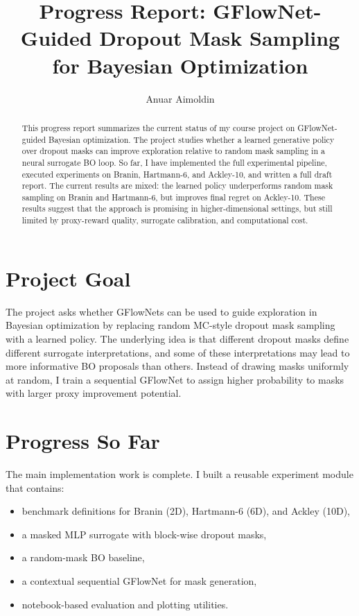 \documentclass{article}
\title{Progress Report: GFlowNet-Guided Dropout Mask Sampling for Bayesian Optimization}
\author{Anuar Aimoldin}
\date{}
\begin{document}
\maketitle

\begin{abstract}
This progress report summarizes the current status of my course project on GFlowNet-guided Bayesian optimization. The project studies whether a learned generative policy over dropout masks can improve exploration relative to random mask sampling in a neural surrogate BO loop. So far, I have implemented the full experimental pipeline, executed experiments on Branin, Hartmann-6, and Ackley-10, and written a full draft report. The current results are mixed: the learned policy underperforms random mask sampling on Branin and Hartmann-6, but improves final regret on Ackley-10. These results suggest that the approach is promising in higher-dimensional settings, but still limited by proxy-reward quality, surrogate calibration, and computational cost.
\end{abstract}

\section{Project Goal}

The project asks whether GFlowNets can be used to guide exploration in Bayesian optimization by replacing random MC-style dropout mask sampling with a learned policy. The underlying idea is that different dropout masks define different surrogate interpretations, and some of these interpretations may lead to more informative BO proposals than others. Instead of drawing masks uniformly at random, I train a sequential GFlowNet to assign higher probability to masks with larger proxy improvement potential.

\section{Progress So Far}

The main implementation work is complete. I built a reusable experiment module that contains:
\begin{itemize}
    \item benchmark definitions for Branin (2D), Hartmann-6 (6D), and Ackley (10D),
    \item a masked MLP surrogate with block-wise dropout masks,
    \item a random-mask BO baseline,
    \item a contextual sequential GFlowNet for mask generation,
    \item notebook-based evaluation and plotting utilities.
\end{itemize}
\end{document}
